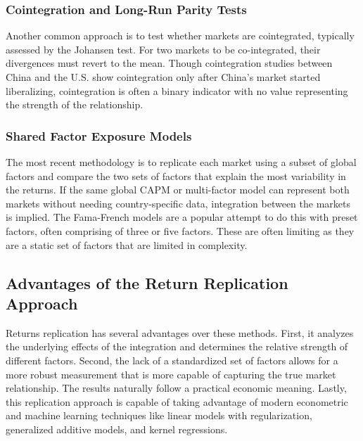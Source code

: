 \subsubsection{Cointegration and Long-Run Parity Tests}

Another common approach is to test whether markets are cointegrated, typically assessed by the Johansen test. For two markets to be co-integrated, their divergences must revert to the mean. Though cointegration studies between China and the U.S. show cointegration only after China's market started liberalizing, cointegration is often a binary indicator with no value representing the strength of the relationship. 

\subsubsection{Shared Factor Exposure Models}

The most recent methodology is to replicate each market using a subset of global factors and compare the two sets of factors that explain the most variability in the returns. If the same global CAPM or multi-factor model can represent both markets without needing country-specific data, integration between the markets is implied. The Fama-French models are a popular attempt to do this with preset factors, often comprising of three or five factors. These are often limiting as they are a static set of factors that are limited in complexity. 

\subsection{Advantages of the Return Replication Approach}

Returns replication has several advantages over these methods. First, it analyzes the underlying effects of the integration and determines the relative strength of different factors. Second, the lack of a standardized set of factors allows for a more robust measurement that is more capable of capturing the true market relationship. The results naturally follow a practical economic meaning. Lastly, this replication approach is capable of taking advantage of modern econometric and machine learning techniques like linear models with regularization, generalized additive models, and kernel regressions.
